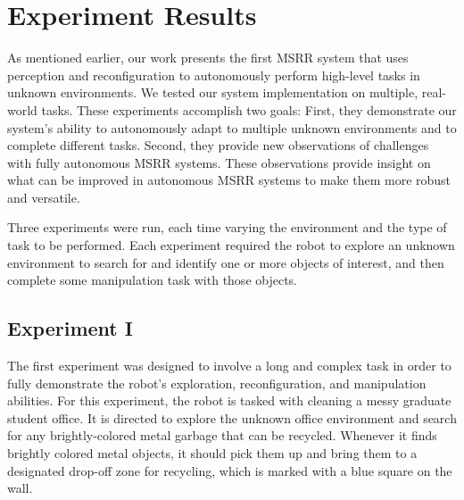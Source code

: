 \documentclass[conference]{IEEEtran}
\begin{document}


\section{Experiment Results}
\label{sec:experiments}
%

As mentioned earlier, our work presents the first MSRR system that uses perception and reconfiguration to autonomously perform high-level tasks in unknown environments. We tested our system implementation on multiple, real-world tasks. These experiments accomplish two goals: First, they demonstrate our system's ability to autonomously adapt to multiple unknown environments and to complete different tasks. Second, they provide new observations of challenges with fully autonomous MSRR systems. These observations provide insight on what can be improved in autonomous MSRR systems to make them more robust and versatile.

Three experiments were run, each time varying the environment and the type of task to be performed. Each experiment required the robot to explore an unknown environment to search for and identify one or more objects of interest, and then complete some manipulation task with those objects.

\subsection{Experiment I}

The first experiment was designed to involve a long and complex task in order to fully demonstrate the robot's exploration, reconfiguration, and manipulation abilities. For this experiment, the robot is tasked with cleaning a messy graduate student office.  It is directed to explore the unknown office environment and search for any brightly-colored metal garbage that can be recycled.  Whenever it finds brightly colored metal objects, it should pick them up and bring them to a designated drop-off zone for recycling, which is marked with a blue square on the wall.
\end{document}
